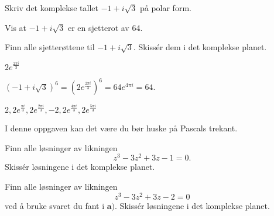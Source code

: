 \begin{oppgave}
\begin{punkt}
Skriv det komplekse tallet $-1+i\sqrt{3}$ på polar form.
\end{punkt}

\begin{punkt}
Vis at $-1+i\sqrt{3}$ er en sjetterot av 64.
\end{punkt}

\begin{punkt}
Finn alle sjetterøttene til $-1+i\sqrt{3}$. Skissér dem i det komplekse planet.
\end{punkt}

\end{oppgave}

\begin{losning}
\begin{punkt}
$2e^{\frac{2\pi i}{3}}$
\end{punkt}

\begin{punkt}
$(-1+i\sqrt{3})^6=(2e^{\frac{2\pi i}{3}})^6=64e^{4\pi i}=64.$
\end{punkt}

\begin{punkt}
$2,2e^{\frac{\pi i}{3}},2e^{\frac{2\pi i}{3}},-2,2e^{\frac{4\pi i}{3}},2e^{\frac{5\pi i}{3}}$


\begin{center}
\end{center}


\end{punkt}

\end{losning}


\begin{oppgave}
I denne oppgaven kan det være du bør huske på Pascals trekant.
\begin{punkt}
Finn alle løsninger av likningen $$z^3-3z^2+3z-1=0.$$ Skissér løsningene i det komplekse planet.
\end{punkt}
\begin{punkt}
Finn alle løsninger av likningen $$z^3-3z^2+3z-2=0$$ ved å bruke svaret du fant i $\textbf{a)}$. Skissér løsningene i det komplekse planet.
\end{punkt}
\end{oppgave}

